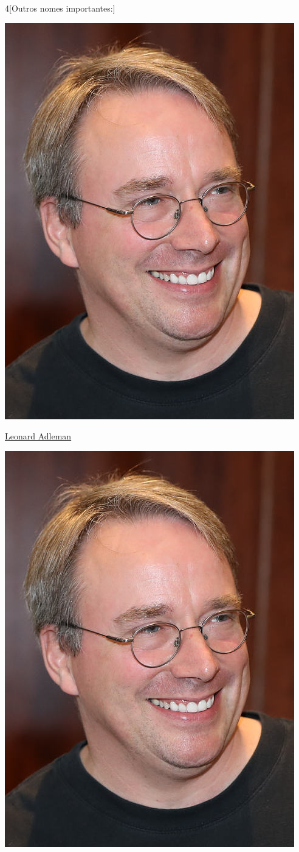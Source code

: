 \begin{multicols}{4}[Outros nomes importantes:]
\begin{center}
					\includegraphics[width=.8\columnwidth]{./IMG-GIT/CIENTISTAS/linus.jpeg}
\end{center}
				
\vfill\null
\columnbreak				
				
				\href{https://pt.wikipedia.org/wiki/Leonard_Adleman}{Leonard Adleman}
				
\begin{center}
					\includegraphics[width=.8\columnwidth]{./IMG-GIT/CIENTISTAS/linus.jpeg}
\end{center}
				

\end{multicols}
